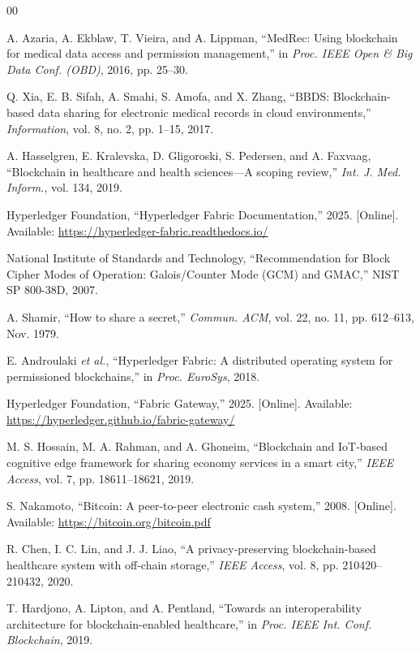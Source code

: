 \documentclass{IEEEtran}
\begin{document}
\begin{thebibliography}{00}

 A. Azaria, A. Ekblaw, T. Vieira, and A. Lippman, ``MedRec: Using blockchain for medical data access and permission management,'' in \emph{Proc. IEEE Open \& Big Data Conf. (OBD)}, 2016, pp. 25--30.

 Q. Xia, E. B. Sifah, A. Smahi, S. Amofa, and X. Zhang, ``BBDS: Blockchain-based data sharing for electronic medical records in cloud environments,'' \emph{Information}, vol. 8, no. 2, pp. 1--15, 2017.

 A. Hasselgren, E. Kralevska, D. Gligoroski, S. Pedersen, and A. Faxvaag, ``Blockchain in healthcare and health sciences---A scoping review,'' \emph{Int. J. Med. Inform.}, vol. 134, 2019.

 Hyperledger Foundation, ``Hyperledger Fabric Documentation,'' 2025. [Online]. Available: \underline{https://hyperledger-fabric.readthedocs.io/}

 National Institute of Standards and Technology, ``Recommendation for Block Cipher Modes of Operation: Galois/Counter Mode (GCM) and GMAC,'' NIST SP 800-38D, 2007.

 A. Shamir, ``How to share a secret,'' \emph{Commun. ACM}, vol. 22, no. 11, pp. 612--613, Nov. 1979.

 E. Androulaki \emph{et al.}, ``Hyperledger Fabric: A distributed operating system for permissioned blockchains,'' in \emph{Proc. EuroSys}, 2018.

 Hyperledger Foundation, ``Fabric Gateway,'' 2025. [Online]. Available: \underline{https://hyperledger.github.io/fabric-gateway/}

 M. S. Hossain, M. A. Rahman, and A. Ghoneim, ``Blockchain and IoT-based cognitive edge framework for sharing economy services in a smart city,'' \emph{IEEE Access}, vol. 7, pp. 18611--18621, 2019.

 S. Nakamoto, ``Bitcoin: A peer-to-peer electronic cash system,'' 2008. [Online]. Available: \underline{https://bitcoin.org/bitcoin.pdf}

 R. Chen, I. C. Lin, and J. J. Liao, ``A privacy-preserving blockchain-based healthcare system with off-chain storage,'' \emph{IEEE Access}, vol. 8, pp. 210420--210432, 2020.

 T. Hardjono, A. Lipton, and A. Pentland, ``Towards an interoperability architecture for blockchain-enabled healthcare,'' in \emph{Proc. IEEE Int. Conf. Blockchain}, 2019.

\end{thebibliography}
\end{document}
